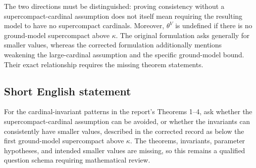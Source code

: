 \documentclass[11pt]{article}
\begin{document}
The two directions must be distinguished: proving consistency without a supercompact-cardinal assumption does not itself mean requiring the resulting model to have no supercompact cardinals. Moreover, \(\theta^V\) is undefined if there is no ground-model supercompact above \(\kappa\). The original formulation asks generally for smaller values, whereas the corrected formulation additionally mentions weakening the large-cardinal assumption and the specific ground-model bound. Their exact relationship requires the missing theorem statements.
\subsection{Short English statement}
For the cardinal-invariant patterns in the report's Theorems 1--4, ask whether the supercompact-cardinal assumption can be avoided, or whether the invariants can consistently have smaller values, described in the corrected record as below the first ground-model supercompact above \(\kappa\). The theorems, invariants, parameter hypotheses, and intended smaller values are missing, so this remains a qualified question schema requiring mathematical review.
\end{document}
